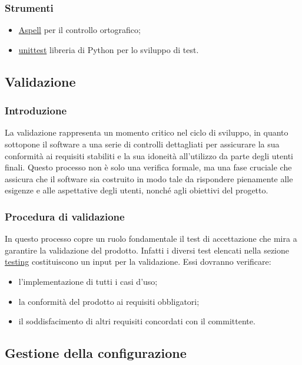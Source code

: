 \subsubsection{Strumenti}

\begin{itemize}
	\item \href{http://aspell.net/}{Aspell} per il controllo ortografico;
	\item \href{https://docs.python.org/3/library/unittest.html}{unittest} libreria di Python per lo sviluppo di test.
\end{itemize}



\subsection{Validazione}
\subsubsection{Introduzione}
La validazione rappresenta un momento critico nel ciclo di sviluppo, in quanto sottopone il software a una serie di controlli dettagliati per assicurare la sua conformità ai requisiti stabiliti e la sua idoneità all'utilizzo da parte degli utenti finali. Questo processo non è solo una verifica formale, ma una fase cruciale che assicura che il software sia costruito in modo tale da rispondere pienamente alle esigenze e alle aspettative degli utenti, nonché agli obiettivi del progetto.

\subsubsection{Procedura di validazione}
In questo processo copre un ruolo fondamentale il test di accettazione che mira a garantire la validazione
del prodotto. Infatti i diversi test elencati nella sezione \underline{\hyperlink{testing}{testing}} costituiscono un input
per la validazione. Essi dovranno verificare:
\begin{itemize}
	\item l'implementazione di tutti i casi d'uso;
	\item la conformità del prodotto ai requisiti obbligatori;
	\item il soddisfacimento di altri requisiti concordati con il committente.
\end{itemize}

\subsection{Gestione della configurazione}
